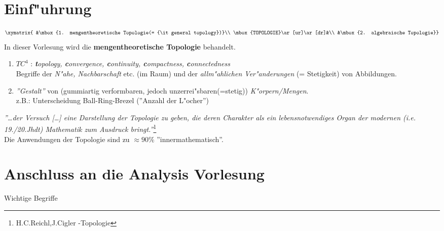 \section{Einf"uhrung}
\setcounter{page}{1}
\vspace{1.5cm}
$$\xymatrix{
&\mbox{1. mengentheoretische Topologie(= {\it general topology})}\\
\mbox{TOPOLOGIE}\ar[ur]\ar[dr]&\\
&\mbox{2. algebraische Topologie}}$$
In dieser Vorlesung wird die {\bf mengentheoretische Topologie} behandelt.\\
\begin{enumerate}
\item $TC^4$ : {\it{\bf t}opology, {\bf c}onvergence, {\bf c}ontinuity, {\bf c}ompactness, {\bf c}onnectedness}\\ Begriffe der {\it N"ahe, Nachbarschaft } etc. (im Raum) und der {\it allm"ahlichen Ver"anderungen} (= Stetigkeit) von Abbildungen.
\item \emph{''Gestalt''} von (gummiartig verformbaren, jedoch unzerrei"sbaren(=stetig)) \emph{K"orpern/Mengen}.\\ z.B.: Unterscheidung Ball-Ring-Brezel (''Anzahl der L"ocher'')
\end{enumerate}
{\it''\dots der Versuch [\dots] eine Darstellung der Topologie zu geben, die deren Charakter als ein lebensnotwendiges Organ der modernen {\small (i.e. 19./20.Jhdt)} Mathematik zum Ausdruck bringt.''}\footnote{H.C.Reichl,J.Cigler -Topologie}\\
Die Anwendungen der Topologie sind zu $\approx 90 \%$ ''innermathematisch''.
\newpage
\section{Anschluss an die Analysis Vorlesung}
{\large Wichtige Begriffe}\\

